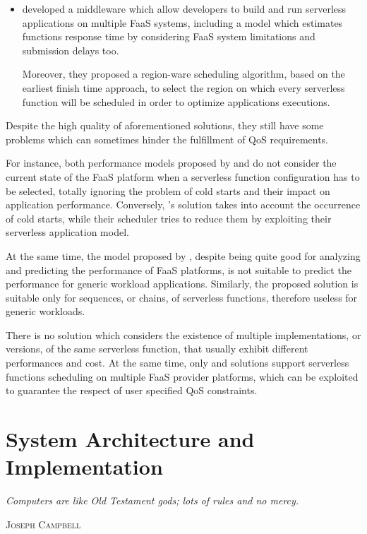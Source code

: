 \documentclass[12pt,a4paper]{report}
\begin{document}
\begin{itemize}
	\item \citet{xAFCL} developed a middleware which allow developers to build and run serverless applications on multiple FaaS systems, including a model which estimates functions response time by considering FaaS system limitations and submission delays too.
	
	Moreover, they proposed a region-ware scheduling algorithm, based on the earliest finish time approach, to select the region on which every serverless function will be scheduled in order to optimize applications executions.
	
	
\end{itemize}

Despite the high quality of aforementioned solutions, they still have some problems which can sometimes hinder the fulfillment of QoS requirements. 

For instance, both performance models proposed by \citet{COSE} and \citet{PMSCP} do not consider the current state of the FaaS platform when a serverless function configuration has to be selected, totally ignoring the problem of cold starts and their impact on application performance. Conversely, \citet{NUOVODOCUMENTO}'s solution takes into account the occurrence of cold starts, while their scheduler tries to reduce them by exploiting their serverless application model.

At the same time, the model proposed by \citet{Modelling}, despite being quite good for analyzing and predicting the performance of FaaS platforms, is not suitable to predict the performance for generic workload applications. Similarly, the \citet{COSE} proposed solution is suitable only for sequences, or chains, of serverless functions, therefore useless for generic workloads. 

There is no solution which considers the existence of multiple implementations, or versions, of the same serverless function, that usually exhibit different performances and cost. At the same time, only \citet{NUOVODOCUMENTO} and \citet{xAFCL} solutions support serverless functions scheduling on multiple FaaS provider platforms, which can be exploited to guarantee the respect of user specified QoS constraints.



\chapter{System Architecture and Implementation}\label{chapterArch}

\epigraph{\itshape Computers are like Old Testament gods; lots of rules and no mercy.}{\textsc{Joseph Campbell}}
\end{document}
